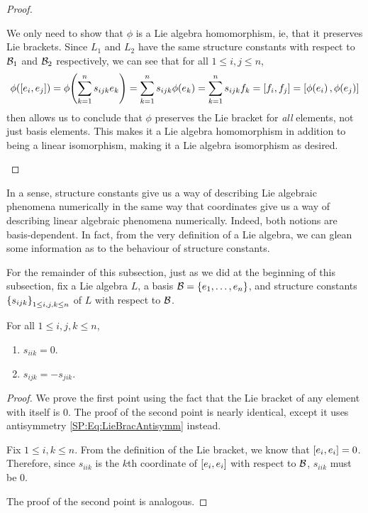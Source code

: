 \begin{proof}
\begin{description}
        We only need to show that $\phi$ is a Lie algebra homomorphism, ie, that it preserves Lie brackets. Since $L_1$ and $L_2$ have the same structure constants with respect to $\mathcal{B}_1$ and $\mathcal{B}_2$ respectively, we can see that for all $1 \leq i, j \leq n$,
        \begin{align*}
            \phi\!\left( \left[ e_i, e_j \right] \right) = \phi\!\left( \sum_{k=1}^{n} s_{ijk} e_k \right) = \sum_{k=1}^{n} s_{ijk} \phi\!\left( e_k \right) = \sum_{k=1}^{n} s_{ijk} f_k = \left[ f_i, f_j \right] = \left[ \phi\!\left( e_i \right), \phi\!\left( e_j \right) \right]
        \end{align*}
         then allows us to conclude that $\phi$ preserves the Lie bracket for \textit{all} elements, not just basis elements. This makes it a Lie algebra homomorphism in addition to being a linear isomorphism, making it a Lie algebra isomorphism as desired.
    \end{description}
    \vspace{-1em}
\end{proof}

In a sense, structure constants give us a way of describing Lie algebraic phenomena numerically in the same way that coordinates give us a way of describing linear algebraic phenomena numerically. Indeed, both notions are basis-dependent. In fact, from the very definition of a Lie algebra, we can glean some information as to the behaviour of structure constants.

For the remainder of this subsection, just as we did at the beginning of this subsection, fix a Lie algebra $L$, a basis $\mathcal{B} = \left\{ e_1, \ldots, e_n \right\}$, and structure constants $\left\{ s_{ijk} \right\}_{1 \leq i, j, k \leq n}$ of $L$ with respect to $\mathcal{B}$.

\begin{boxlemma}\label{Ch1:Lemma:StructureConstantsBhv}
    For all $1 \leq i, j, k \leq n$,
    \begin{enumerate}
        \item $s_{iik} = 0$.
        \item $s_{ijk} = -s_{jik}$.
    \end{enumerate}
\end{boxlemma}
\begin{proof}
    We prove the first point using the fact that the Lie bracket of any element with itself is $0$. The proof of the second point is nearly identical, except it uses antisymmetry \eqref{SP:Eq:LieBracAntisymm} instead.
    
    Fix $1 \leq i, k \leq n$. From the definition of the Lie bracket, we know that $\left[ e_i, e_i \right] = 0$. Therefore, since $s_{iik}$ is the $k$th coordinate of $\left[ e_i, e_i \right]$ with respect to $\mathcal{B}$, $s_{iik}$ must be $0$.

    The proof of the second point is analogous.
\end{proof}

